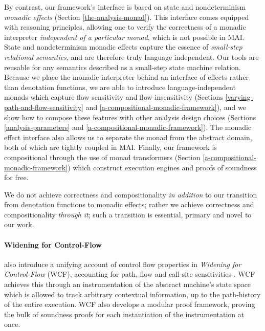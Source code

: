 \par

By contrast, our framework's interface is based on state and
nondeterminism \emph{monadic effects} (Section
\ref{the-analysis-monad}). This interface comes equipped with reasoning
principles, allowing one to verify the correctness of a monadic
interpreter \emph{independent of a particular monad}, which is not
possible in MAI. State and nondeterminism monadic effects capture the
essence of \emph{small-step relational semantics}, and are therefore
truly language independent. Our tools are reusable for any semantics
described as a small-step state machine relation. Because we place the
monadic interpreter behind an interface of effects rather than
denotation functions, we are able to introduce language-independent
monads which capture flow-sensitivity and flow-insensitivity (Sections
\ref{varying-path-and-flow-sensitivity} and
\ref{a-compositional-monadic-framework}), and we show how to compose
these features with other analysis design choices (Sections
\ref{analysis-parameters} and \ref{a-compositional-monadic-framework}).
The monadic effect interface also allows us to separate the monad from
the abstract domain, both of which are tightly coupled in MAI. Finally,
our framework is compositional through the use of monad transformers
(Section \ref{a-compositional-monadic-framework}) which construct
execution engines and proofs of soundness for free.

\par

We do not achieve correctness and compositionality \emph{in addition} to
our transition from denotation functions to monadic effects; rather we
achieve correctness and compositionality \emph{through it}; such a
transition is essential, primary and novel to our work.

\par

\paragraph{Widening for Control-Flow}

\par

\citeauthor{dvanhorn:Hardekopf2014Widening} also introduce a unifying
account of control flow properties in \emph{Widening for Control-Flow}
(WCF)\cite{dvanhorn:Hardekopf2014Widening}, accounting for path, flow
and call-site sensitivities . WCF achieves this through an
instrumentation of the abstract machine's state space which is allowed
to track arbitrary contextual information, up to the path-history of the
entire execution. WCF also develops a modular proof framework, proving
the bulk of soundness proofs for each instantiation of the
instrumentation at once.

